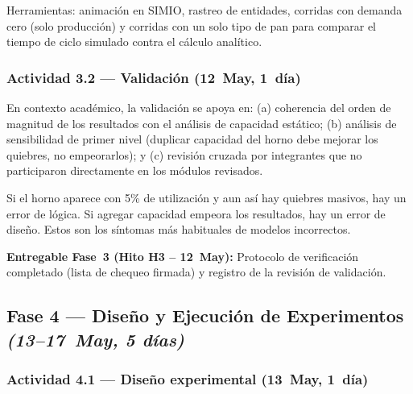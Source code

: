 \documentclass[12pt]{article}
\begin{document}
Herramientas: animación en SIMIO, rastreo de entidades, corridas con demanda cero (solo producción) y corridas con un solo tipo de pan para comparar el tiempo de ciclo simulado contra el cálculo analítico.

\subsubsection{Actividad 3.2 --- Validación \quad(12~May, 1~día)}

En contexto académico, la validación se apoya en: (a) coherencia del orden de magnitud de los resultados con el análisis de capacidad estático; (b) análisis de sensibilidad de primer nivel (duplicar capacidad del horno debe mejorar los quiebres, no empeorarlos); y (c) revisión cruzada por integrantes que no participaron directamente en los módulos revisados.

Si el horno aparece con 5\% de utilización y aun así hay quiebres masivos, hay un error de lógica. Si agregar capacidad empeora los resultados, hay un error de diseño. Estos son los síntomas más habituales de modelos incorrectos.

\medskip
\noindent\colorbox{grisclaro}{\parbox{\dimexpr\linewidth-2\fboxsep\relax}{\vspace{2pt}\textbf{Entregable Fase~3 (Hito H3 -- 12~May):} Protocolo de verificación completado (lista de chequeo firmada) y registro de la revisión de validación.\vspace{2pt}}}

\subsection{Fase 4 --- Diseño y Ejecución de Experimentos \quad\textit{(13--17~May, 5 días)}}

\subsubsection{Actividad 4.1 --- Diseño experimental \quad(13~May, 1~día)}
\end{document}

